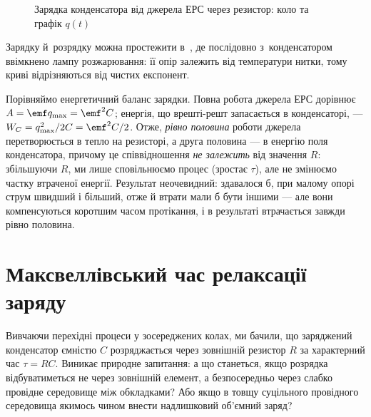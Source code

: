 \begin{figure}[h!]\centering
	\caption{Зарядка конденсатора від джерела ЕРС через резистор: коло та графік $q(t)$\label{pic:RCCharge}}
\end{figure}


\begin{Simulation}
Зарядку й~розрядку можна простежити в~, де послідовно з~конденсатором ввімкнено лампу розжарювання: її опір залежить від температури нитки, тому криві відрізняються від чистих експонент.
\end{Simulation}

Порівняймо енергетичний баланс зарядки. Повна робота джерела ЕРС дорівнює $A = \emf q_{\max} = \emf^2 C$; енергія, що врешті-решт запасається в конденсаторі, --- $W_C = q_{\max}^2/2C = \emf^2 C/2$. Отже, \emph{рівно половина} роботи джерела перетворюється в тепло на резисторі, а друга половина --- в енергію поля конденсатора, причому це співвідношення \emph{не залежить} від значення $R$: збільшуючи $R$, ми лише сповільнюємо процес (зростає $\tau$), але не змінюємо частку втраченої енергії. Результат неочевидний: здавалося б, при малому опорі струм швидший і більший, отже й втрати мали б бути іншими --- але вони компенсуються коротшим часом протікання, і в результаті втрачається завжди рівно половина.


\section{Максвеллівський час релаксації заряду}\hypertarget{maxwell-relaxation-time}{}

Вивчаючи перехідні процеси у зосереджених колах, ми бачили, що заряджений конденсатор ємністю $C$ розряджається через зовнішній резистор $R$ за характерний час $\tau = RC$. Виникає природне запитання: а що станеться, якщо розрядка відбуватиметься не через зовнішній елемент, а безпосередньо через слабко провідне середовище між обкладками? Або якщо в товщу суцільного провідного середовища якимось чином внести надлишковий об'ємний заряд?

